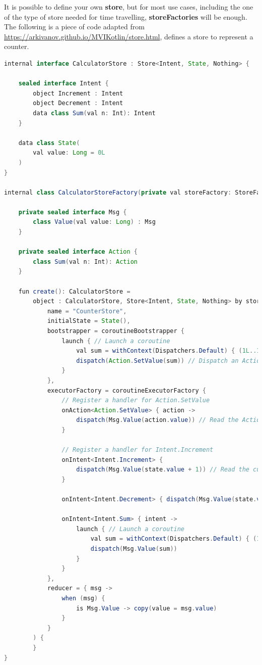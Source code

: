 It is possible to define your own \textbf{store}, but for most use cases, including the one of the type of store needed for time travelling, \textbf{storeFactories} will be enough. The following is a piece of code adapted from \url{https://arkivanov.github.io/MVIKotlin/store.html}, defines a store to represent a counter.


\begin{lstlisting}[language=java]
internal interface CalculatorStore : Store<Intent, State, Nothing> {

    sealed interface Intent {
        object Increment : Intent
        object Decrement : Intent
        data class Sum(val n: Int): Intent
    }

    data class State(
        val value: Long = 0L
    )
}

internal class CalculatorStoreFactory(private val storeFactory: StoreFactory) {

	private sealed interface Msg {
        class Value(val value: Long) : Msg
    }

	private sealed interface Action {
        class Sum(val n: Int): Action
    }

    fun create(): CalculatorStore =
        object : CalculatorStore, Store<Intent, State, Nothing> by storeFactory.create<Intent, Action, Msg, State, Nothing>(
            name = "CounterStore",
            initialState = State(),
            bootstrapper = coroutineBootstrapper {
                launch { // Launch a coroutine
                    val sum = withContext(Dispatchers.Default) { (1L..1000000.toLong()).sum() }
                    dispatch(Action.SetValue(sum)) // Dispatch an Action
                }
            },
            executorFactory = coroutineExecutorFactory {
                // Register a handler for Action.SetValue
                onAction<Action.SetValue> { action ->
                    dispatch(Msg.Value(action.value)) // Read the Action and dispatch a Message
                }

                // Register a handler for Intent.Increment
                onIntent<Intent.Increment> {
                    dispatch(Msg.Value(state.value + 1)) // Read the current state and dispatch a Message
                }

                onIntent<Intent.Decrement> { dispatch(Msg.Value(state.value - 1)) }

                onIntent<Intent.Sum> { intent ->
                    launch { // Launch a coroutine
                        val sum = withContext(Dispatchers.Default) { (1L..intent.n.toLong()).sum() }
                        dispatch(Msg.Value(sum))
                    }
                }
            },
            reducer = { msg ->
                when (msg) {
                    is Msg.Value -> copy(value = msg.value)
                }
            }
        ) {
        }
}

\end{lstlisting}

